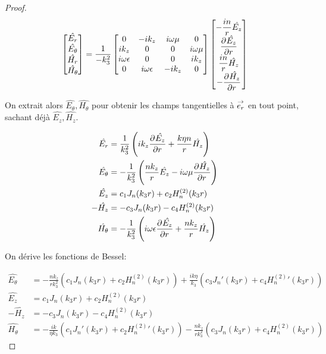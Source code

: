\begin{proof}
    \begin{equation}
      \begin{bmatrix}
        \hat{E_r}\\
        \hat{E_\theta}\\
        \hat{H_r}\\
        \hat{H_\theta}
      \end{bmatrix} =
      \frac{1}{-k_3^2}
      \begin{bmatrix}
      0 & -ik_z & i\w\mu & 0
      \\
      ik_z & 0 & 0 & i\w\mu
      \\
      i\w\eps & 0 & 0 & ik_z
      \\
      0 & i\w\eps & -ik_z & 0
      \end{bmatrix}
      \begin{bmatrix}
        -\frac{in}{r}\hat{E_z}\\
        \ddr{r}{\hat{E_z}}\\
        \frac{in}{r}\hat{H_z}\\
        -\ddr{r}{\hat{H_z}}
      \end{bmatrix}
    \end{equation}

    On extrait alors \(\hat{E_\theta}, \hat{H_\theta}\) pour obtenir les champs tangentielles à \(\vect{e_r}\) en tout point, sachant déjà \(\hat{E_z}, \hat{H_z}\).

    \begin{align}
      \hat{E_r} & = \frac{1}{k_3^2}\left(ik_z\ddr{r}{\hat{E_z}}+\frac{k\eta n}{r}\hat{H_z}\right)
      \\
      \hat{E_\theta} &= -\frac{1}{k_3^2}\left(\frac{nk_z}{r}\hat{E_z} - i\w\mu\ddr{r}{\hat{H_z}}\right)
      \\
      \hat{E_z} &= c_1 J_n(k_3 r) + c_2 H_n^{(2)}(k_3 r)
      \\
      -\hat{H_z} &= -c_3 J_n(k_3 r) - c_4 H_n^{(2)}(k_3 r)
      \\
      \hat{H_\theta} &= -\frac{1}{k_3^2}\left(i\w\eps\ddr{r}{\hat{E_z}} + \frac{nk_z}{r}\hat{H_z}\right)
    \end{align}

    On dérive les fonctions de Bessel:

     \begin{align}
      \hat{E_\theta} &= -\frac{nk_z}{rk_3^2}\left(c_1J_n(k_3r) + c_2 H_n^{(2)}(k_3r)\right) + \frac{ik\eta}{k_3}\left(c_3J_n'(k_3r) + c_4 H_n^{(2)}{}'(k_3r)\right)
      \\
      \hat{E_z} &= c_1 J_n(k_3 r) + c_2 H_n^{(2)}(k_3 r)
      \\
      -\hat{H_z} &= -c_3 J_n(k_3 r) - c_4 H_n^{(2)}(k_3 r)
      \\
      \hat{H_\theta} &= -\frac{ik}{\eta k_3}\left(c_1J_n'(k_3r) + c_2 H_n^{(2)}{}'(k_3r)\right) - \frac{nk_z}{rk_3^2}\left(c_3J_n(k_3r) + c_4 H_n^{(2)}(k_3r)\right)
    \end{align}


\end{proof}
